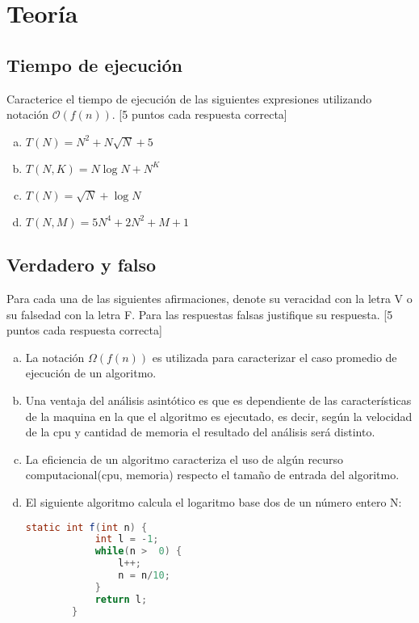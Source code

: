 \documentclass{exam}
\begin{document}
\section{Teoría}
\subsection{Tiempo de ejecución}
Caracterice el tiempo de ejecución de las siguientes expresiones utilizando notación $\mathcal{O}(f(n))$. [5 puntos cada respuesta correcta]
\begin{enumerate}[a.]
    \item $T(N) = N^2 + N\sqrt{N} + 5$
    \vspace{1cm}
    \item $T(N, K) = N \log N + N ^ K$
    \vspace{1cm}
    \item $T(N) = \sqrt{N} + \log N$
    \vspace{1cm}
    \item $T(N, M) = 5N^4 + 2N^2 + M + 1$
    \vspace{1cm}
\end{enumerate}
\subsection{Verdadero y falso}
Para cada una de las siguientes afirmaciones, denote su veracidad con la letra V o su falsedad con la letra F. Para las respuestas falsas justifique su respuesta. [5 puntos cada respuesta correcta]
\begin{enumerate}[a.]
    \item \underline{\hspace{0.7cm}} La notación $\Omega(f(n))$ es utilizada para caracterizar el caso promedio de ejecución de un algoritmo.
    \vspace{1cm}
    \item \underline{\hspace{0.7cm}} Una ventaja del análisis asintótico es que es dependiente de las características de la maquina en la que el algoritmo es ejecutado, es decir, según la velocidad de la cpu y cantidad de memoria el resultado del análisis será distinto.
    \vspace{1cm}
    \item \underline{\hspace{0.7cm}} La eficiencia de un algoritmo caracteriza el uso de algún recurso computacional(cpu, memoria) respecto el tamaño de entrada del algoritmo.
    \vspace{1cm}
    \item \underline{\hspace{0.7cm}} El siguiente algoritmo calcula el logaritmo base dos de un número entero N:
        \begin{lstlisting}[language=java]
        static int f(int n) {
            int l = -1;
            while(n >  0) {
                l++;
                n = n/10;
            }
            return l;
        }
        \end{lstlisting}
\end{enumerate}
\end{document}
